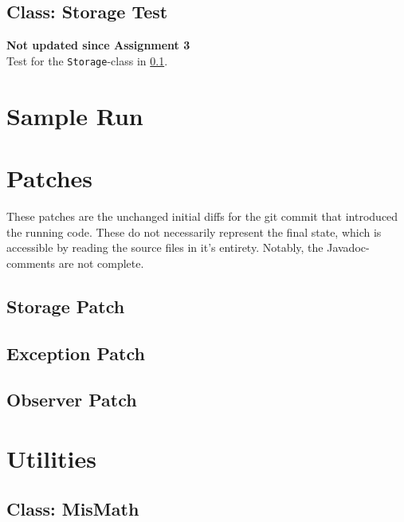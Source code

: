 \documentclass[a4paper]{scrreprt}
\begin{document}
\subsection{Class: Storage Test}
\label{subsec:storagetest.java}

\footnotesize\textbf{Not updated since Assignment 3}\\
\normalsize Test for the \texttt{Storage}-class in \ref{subsec:storagetest.java}.



\section{Sample Run}
\label{sec:samplerun}



\section{Patches}
These patches are the unchanged initial diffs for the git commit that introduced the running code. These do not necessarily represent the final state, which is accessible by reading the source files in it's entirety. Notably, the Javadoc-comments are not complete.

\subsection{Storage Patch}
\label{subsec:storagepatch}



\subsection{Exception Patch}
\label{subsec:exceptionpatch}




\subsection{Observer Patch}
\label{subsec:observerpatch}



\section{Utilities}

\subsection{Class: MisMath}
\label{subsec:mismath.java}

\end{document}
